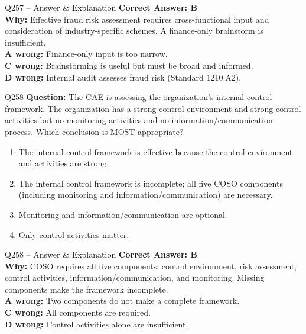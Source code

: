 \documentclass[aspectratio=169,10pt]{beamer}
\begin{document}
	\begin{frame}[t]{Q257 -- Answer \& Explanation}
		\small
		\textbf{Correct Answer: B} \\[4pt]
		\textbf{Why:} Effective fraud risk assessment requires cross-functional input and consideration of industry-specific schemes. A finance-only brainstorm is insufficient. \\[4pt]
		\textbf{A wrong:} Finance-only input is too narrow. \\[2pt]
		\textbf{C wrong:} Brainstorming is useful but must be broad and informed. \\[2pt]
		\textbf{D wrong:} Internal audit assesses fraud risk (Standard 1210.A2).
	\end{frame}
	
	\begin{frame}[t]{Q258}
		\small
		\textbf{Question:} The CAE is assessing the organization's internal control framework. The organization has a strong control environment and strong control activities but no monitoring activities and no information/communication process. Which conclusion is MOST appropriate?
		\begin{enumerate}[label=\Alph*.,itemsep=1pt,topsep=2pt]
			\item The internal control framework is effective because the control environment and activities are strong.
			\item The internal control framework is incomplete; all five COSO components (including monitoring and information/communication) are necessary.
			\item Monitoring and information/communication are optional.
			\item Only control activities matter.
		\end{enumerate}
	\end{frame}
	
	\begin{frame}[t]{Q258 -- Answer \& Explanation}
		\small
		\textbf{Correct Answer: B} \\[4pt]
		\textbf{Why:} COSO requires all five components: control environment, risk assessment, control activities, information/communication, and monitoring. Missing components make the framework incomplete. \\[4pt]
		\textbf{A wrong:} Two components do not make a complete framework. \\[2pt]
		\textbf{C wrong:} All components are required. \\[2pt]
		\textbf{D wrong:} Control activities alone are insufficient.
	\end{frame}
	
\end{document}
